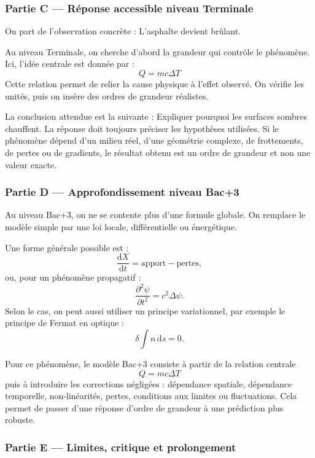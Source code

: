 \documentclass[11pt,a4paper]{article}
\begin{document}
\subsubsection*{Partie C — Réponse accessible niveau Terminale}

\begin{corrigebox}
On part de l'observation concrète : L'asphalte devient brûlant.

Au niveau Terminale, on cherche d'abord la grandeur qui contrôle le phénomène. Ici, l'idée centrale est donnée par :
\[
Q=mc\Delta T
\]
Cette relation permet de relier la cause physique à l'effet observé. On vérifie les unités, puis on insère des ordres de grandeur réalistes.

La conclusion attendue est la suivante : Expliquer pourquoi les surfaces sombres chauffent. La réponse doit toujours préciser les hypothèses utilisées. Si le phénomène dépend d'un milieu réel, d'une géométrie complexe, de frottements, de pertes ou de gradients, le résultat obtenu est un ordre de grandeur et non une valeur exacte.
\end{corrigebox}

\subsubsection*{Partie D — Approfondissement niveau Bac+3}

\begin{approfondissementbox}
Au niveau Bac+3, on ne se contente plus d'une formule globale. On remplace le modèle simple par une loi locale, différentielle ou énergétique.

Une forme générale possible est :
\[
\frac{\mathrm d X}{\mathrm dt}=\text{apport}-\text{pertes},
\]
ou, pour un phénomène propagatif :
\[
\frac{\partial^2 \psi}{\partial t^2}=c^2\Delta\psi.
\]
Selon le cas, on peut aussi utiliser un principe variationnel, par exemple le principe de Fermat en optique :
\[
\delta \int n\,\mathrm ds=0.
\]

Pour ce phénomène, le modèle Bac+3 consiste à partir de la relation centrale
\[
Q=mc\Delta T
\]
puis à introduire les corrections négligées : dépendance spatiale, dépendance temporelle, non-linéarités, pertes, conditions aux limites ou fluctuations. Cela permet de passer d'une réponse d'ordre de grandeur à une prédiction plus robuste.
\end{approfondissementbox}

\subsubsection*{Partie E — Limites, critique et prolongement}
\end{document}
